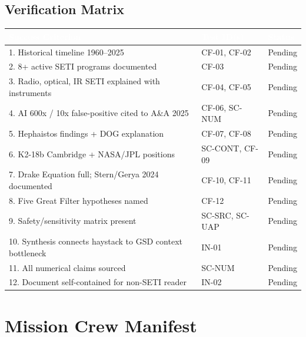 \documentclass[11pt,letterpaper]{article}
\newcommand{\tableheader}[1]{\textbf{\sffamily\textcolor{white}{#1}}}
\begin{document}
\subsection{Verification Matrix}

\begin{center}
\begin{tabularx}{\textwidth}{XL{3.5cm}C{1.5cm}}
\toprule
{}
\tableheader{Success Criterion} & \tableheader{Test ID(s)} & \tableheader{Status} \\
. Historical timeline 1960--2025 & CF-01, CF-02 & Pending \\
2. 8+ active SETI programs documented & CF-03 & Pending \\
3. Radio, optical, IR SETI explained with instruments & CF-04, CF-05 & Pending \\
4. AI 600x / 10x false-positive cited to A\&A 2025 & CF-06, SC-NUM & Pending \\
5. Hephaistos findings + DOG explanation & CF-07, CF-08 & Pending \\
6. K2-18b Cambridge + NASA/JPL positions & SC-CONT, CF-09 & Pending \\
7. Drake Equation full; Stern/Gerya 2024 documented & CF-10, CF-11 & Pending \\
8. Five Great Filter hypotheses named & CF-12 & Pending \\
9. Safety/sensitivity matrix present & SC-SRC, SC-UAP & Pending \\
10. Synthesis connects haystack to GSD context bottleneck & IN-01 & Pending \\
11. All numerical claims sourced & SC-NUM & Pending \\
12. Document self-contained for non-SETI reader & IN-02 & Pending \\
\bottomrule
\end{tabularx}
\end{center}

\section{Mission Crew Manifest}
\end{document}
